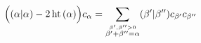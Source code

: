 \begin{equation}\label{Peterson1}
\Big( (\alpha|\alpha) - 2 \, {\rm ht} \, (\alpha) \Big) c_\alpha =
\sum_{\stackrel{\beta', \beta'' > 0}{\beta' + \beta'' = \alpha}}
(\beta' | \beta'') c_{\beta'} c_{\beta''}
\end{equation}

